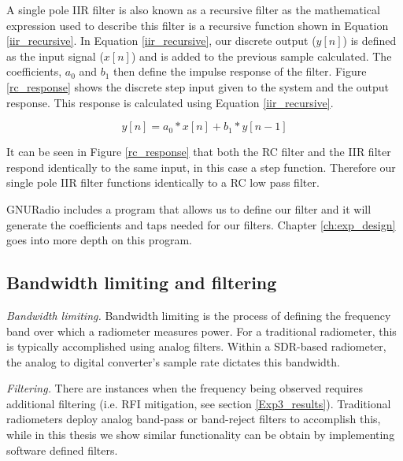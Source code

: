 A single pole IIR filter is also known as a recursive filter as the mathematical expression used to describe this filter is a recursive function shown in Equation \ref{iir_recursive}.  In Equation \ref{iir_recursive}, our discrete output ($y[n]$) is defined as the input signal ($x[n]$) and is added to the previous sample calculated.  The coefficients, $a_0$ and $b_1$ then define the impulse response of the filter.  Figure \ref{rc_response} shows the discrete step input given to the system and the output response.  This response is calculated using Equation \ref{iir_recursive}.

\begin{equation}\label{iir_recursive}
y[n] = a_0 * x[n] + b_1 * y[n-1]
\end{equation}


It can be seen in Figure \ref{rc_response} that both the RC filter and the IIR filter respond identically to the same input, in this case a step function.  Therefore our single pole IIR filter functions identically to a RC low pass filter.  

GNURadio includes a program that allows us to define our filter and it will generate the coefficients and taps needed for our filters.  Chapter \ref{ch:exp_design} goes into more depth on this program.

\subsection{Bandwidth limiting and filtering}

\emph{Bandwidth limiting.}  Bandwidth limiting is the process of defining the frequency band over which a radiometer measures power.  For a traditional radiometer, this is typically accomplished using analog filters.  Within a SDR-based radiometer, the analog to digital converter's sample rate dictates this bandwidth.

\emph{Filtering.}  There are instances when the frequency being observed requires additional filtering (i.e. RFI mitigation, see section \ref{Exp3_results}).  Traditional radiometers deploy analog band-pass or band-reject filters to accomplish this, while in this thesis we show similar functionality can be obtain by implementing software defined filters. 

